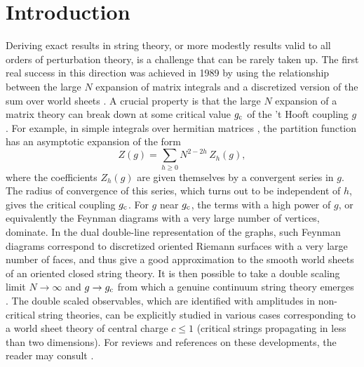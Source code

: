 \documentclass[a4paper,12pt]{article}
\begin{document}
\section{Introduction}
%
Deriving exact results in string theory, or more modestly results
valid to all orders of perturbation theory, is a challenge that can be 
rarely taken up. The first real success in this direction was achieved in 
1989 \cite{BK} by using the relationship between the large $N$ expansion 
of matrix integrals and a discretized version of the sum over world sheets
\cite{tHooft,DK}. A crucial property is that the large $N$
expansion of a matrix theory can break down at some critical value 
$g_{\rm c}$ of the 't Hooft coupling $g$. For example, in simple
integrals over hermitian matrices \cite{IZ},
the partition function has an asymptotic expansion of the form
%
\begin{equation}
\label{Zexp}
Z(g) = \sum_{h\geq 0} N^{2 -2h}\, Z_h(g),
\end{equation}
%
where the coefficients $Z_h(g)$ are given themselves by a convergent
series in
$g$. The radius of convergence of this series, which turns out to be
independent of $h$, gives the critical
coupling $g_{\rm c}$. For $g$ near $g_{\rm c}$, the terms with a high
power of $g$, or equivalently the Feynman diagrams with a very large
number of vertices, dominate. In the dual double-line representation of
the graphs, such Feynman diagrams correspond to discretized oriented
Riemann surfaces with a very large number of faces, and thus
give a good approximation to the smooth world sheets of an oriented closed 
string theory. It is then possible to take a double scaling limit
$N\rightarrow \infty$ and $g\rightarrow g_{\rm c}$ from which a genuine
continuum string theory emerges \cite{BK}. 
The double scaled observables, which
are identified with amplitudes in non-critical string theories, 
can be explicitly studied in various cases corresponding to a world
sheet theory of central charge $c\leq 1$ (critical strings propagating in
less than two dimensions). For reviews and references on these
developments, the reader may consult \cite{review}.
\end{document}
